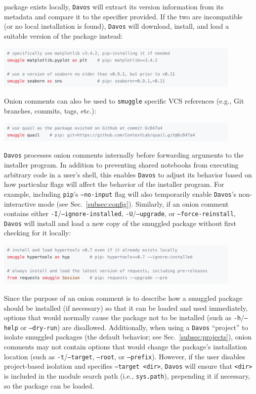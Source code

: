 \documentclass[preprint,12pt,a4paper]{elsarticle}
\begin{document}
package exists locally, \texttt{Davos} will extract its version information from its
metadata and compare it to the specifier provided. If the two are incompatible
(or no local installation is found), \texttt{Davos} will download, install, and load a
suitable version of the package instead:
\begin{center}
  \includegraphics[width=0.9\textwidth]{figs/snippet3}
\end{center}
Onion comments can also be used to \texttt{smuggle} specific VCS references (e.g.,
Git~\cite{TorvHama05} branches, commits, tags, etc.):
\begin{center}
  \includegraphics[width=0.9\textwidth]{figs/snippet4}
\end{center}
\texttt{Davos} processes onion comments internally before forwarding arguments to the
installer program. In addition to preventing shared notebooks from executing
arbitrary code in a user's shell, this enables \texttt{Davos} to adjust its behavior
based on how particular flags will affect the behavior of the installer
program. For example, including \texttt{pip}'s \texttt{--no-input} flag will also
temporarily enable \texttt{Davos}'s non-interactive mode (see Sec.~\ref{subsec:config}).
Similarly, if an onion comment contains either \texttt{-I}/\texttt{--ignore-installed},
\texttt{-U}/\texttt{--upgrade}, or \texttt{--force-reinstall}, \texttt{Davos} will
install and load a new copy of the smuggled package without first checking
for it locally:
\begin{center}
  \includegraphics[width=0.9\textwidth]{figs/snippet5}
\end{center}
Since the purpose of an onion comment is to describe how a smuggled package
should be installed (if necessary) so that it can be loaded and used
immediately, options that would normally cause the package not to be installed
(such as \texttt{-h}/\texttt{--help} or \texttt{--dry-run}) are disallowed. Additionally,
when using a \texttt{Davos} ``project'' to isolate smuggled packages (the default behavior;
see Sec.~\ref{subsec:projects}), onion comments may not contain options that
would change the package's installation location (such as
\texttt{-t}/\texttt{--target}, \texttt{--root}, or \texttt{--prefix}). However, if
the user disables project-based isolation and specifies \texttt{--target <dir>},
\texttt{Davos} will ensure that \texttt{<dir>} is included in the module search path (i.e.,
\texttt{sys.path}), prepending it if necessary, so the package can be loaded.
\end{document}
